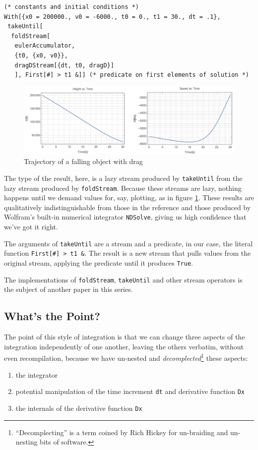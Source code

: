 \documentclass[10pt,oneside,x11names]{article}
\begin{document}
\begin{verbatim}
(* constants and initial conditions *)
With[{x0 = 200000., v0 = -6000., t0 = 0., t1 = 30., dt = .1},
 takeUntil[
  foldStream[
   eulerAccumulator,
   {t0, {x0, v0}},
   dragDStream[{dt, t0, dragD}]
   ], First[#] > t1 &]] (* predicate on first elements of solution *)
\end{verbatim}

\begin{figure}[htb]
\centering
\includegraphics[width=.9\linewidth]{NDSolveFallingWithDrag.png}
\caption{\label{fig:orgparagraph1}
Trajectory of a falling object with drag}
\end{figure}

The type of the result, here, is a lazy stream produced by \texttt{takeUntil} from the
lazy stream produced by \texttt{foldStream}. Because these streams are lazy, nothing
happens until we demand values for, say, plotting, as in figure
\ref{fig:orgparagraph1}. These results are qualitatively
indistinguishable from those in the reference and those produced by Wolfram's
built-in numerical integrator \texttt{NDSolve}, giving us high confidence that we've
got it right.

The arguments of \texttt{takeUntil} are a stream and a predicate, in our case, the
literal function \texttt{First[\#] > t1 \&}. The result is a new
stream that pulls values from the original stream, applying the predicate until
it produces \texttt{True}. 

The implementations of \texttt{foldStream}, \texttt{takeUntil} and other stream operators is
the subject of another paper in this series.

\subsection{What's the Point?}
\label{sec:orgheadline7}

The point of this style of integration is that we can change three aspects of
the integration independently of one another, leaving the others verbatim,
without even recompilation, because we have un-nested and \emph{decomplected}\footnote{``Decomplecting'' is a term coined by Rich Hickey for un-braiding and
un-nesting bits of software.} these aspects:
\begin{enumerate}
\item the integrator
\item potential manipulation of the time increment \texttt{dt} and derivative function \texttt{Dx}
\item the internals of the derivative function \texttt{Dx}
\end{enumerate}
\end{document}
